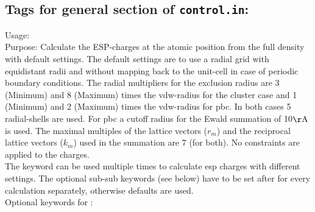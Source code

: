 \subsection*{Tags for general section of \texttt{control.in}:}
{
  \noindent
  Usage:  \\[1.0ex]
  Purpose: Calculate the ESP-charges at the atomic position from the full density with default settings. The default settings are to 
  use a radial grid with equidistant radii and without mapping back to the unit-cell in case of periodic boundary conditions. The radial 
  multipliers for the exclusion radius are 3 (Minimum) and 8 (Maximum) times the vdw-radius for the cluster case and 
  1 (Minimum) and 2 (Maximum) times the vdw-radius for pbc. In both cases 5 radial-shells are used. For pbc a cutoff radius for 
  the Ewald summation of 10$\mathrm{\AA}$ is used. The maximal multiples of the lattice vectors ($r_m$) and the reciprocal 
  lattice vectors ($k_m$) used in the summation are 7 (for both). No constraints are applied to the charges.\\
  The keyword can be used multiple times to calculate esp charges with different settings. The optional sub-sub keywords 
  (see below) have to be set after   for every calculation separately, 
   otherwise defaults are used.\\}
Optional keywords for  :\\
